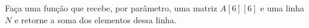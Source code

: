 
\question[10]

Faça uma função que recebe, por parâmetro, uma matriz $A[6][6]$ e uma linha $N$ e retorne a soma dos elementos dessa linha.
